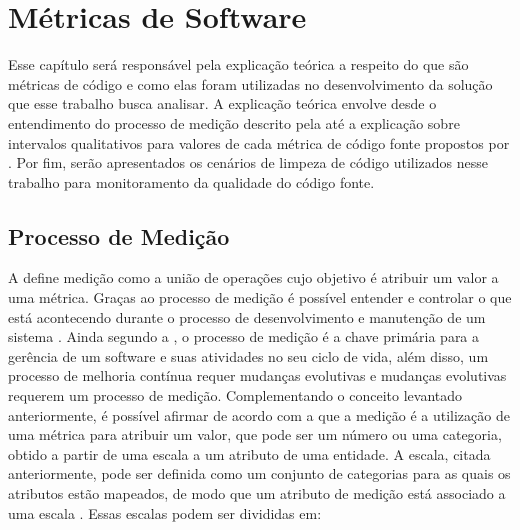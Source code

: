 \chapter{Métricas de Software}
\label{chap:metricas}

Esse capítulo será responsável pela explicação teórica a respeito do que são métricas de código e como elas foram utilizadas no desenvolvimento da solução que esse trabalho busca analisar. A explicação teórica envolve desde o entendimento do processo de medição descrito pela  até a explicação sobre intervalos qualitativos para valores de cada métrica de código fonte propostos por . Por fim, serão apresentados os cenários de limpeza de código utilizados nesse trabalho para monitoramento da qualidade do código fonte.

\section{Processo de Medição}

A  define medição como a união de operações cujo objetivo é atribuir um valor a uma métrica. Graças ao processo de medição é possível entender e controlar o que está acontecendo durante o processo de desenvolvimento e manutenção de um sistema . Ainda segundo a , o processo de medição é a chave primária para a gerência de um software e suas atividades no seu ciclo de vida, além disso, um processo de melhoria contínua requer mudanças evolutivas e mudanças evolutivas requerem um processo de medição.
	Complementando o conceito levantado anteriormente, é possível afirmar de acordo com a  que a medição é a utilização de uma métrica para  atribuir um valor, que pode ser um número ou uma categoria, obtido a partir de uma escala a um atributo de uma entidade.
	A escala, citada anteriormente, pode ser definida como um conjunto de categorias para as quais os atributos estão mapeados, de modo que um atributo de medição está associado a uma escala . Essas escalas podem ser divididas em:	

